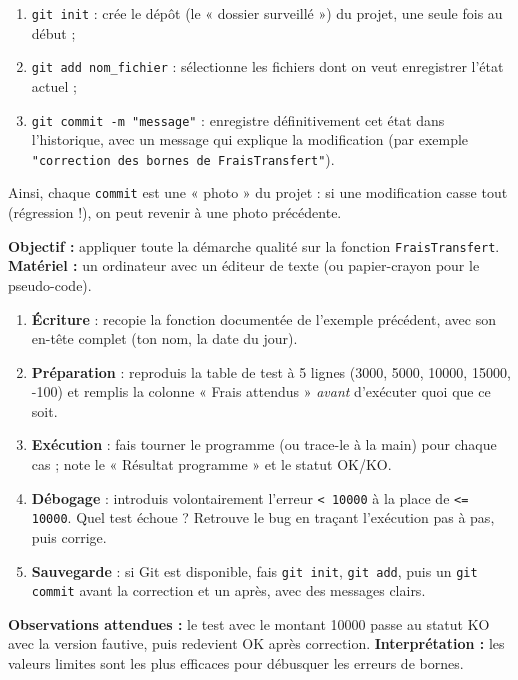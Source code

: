 \documentclass[11pt]{article}
\begin{document}
\begin{methode}
\begin{enumerate}
\item \texttt{git init} : crée le dépôt (le « dossier surveillé ») du projet, une seule fois au début ;
\item \texttt{git add nom\_fichier} : sélectionne les fichiers dont on veut enregistrer l'état actuel ;
\item \texttt{git commit -m "message"} : enregistre définitivement cet état dans l'historique, avec un message qui explique la modification (par exemple \texttt{"correction des bornes de FraisTransfert"}).
\end{enumerate}
Ainsi, chaque \texttt{commit} est une « photo » du projet : si une modification casse tout (régression !), on peut revenir à une photo précédente.
\end{methode}

\begin{experience}
\textbf{Objectif :} appliquer toute la démarche qualité sur la fonction \texttt{FraisTransfert}. \textbf{Matériel :} un ordinateur avec un éditeur de texte (ou papier-crayon pour le pseudo-code).
\begin{enumerate}
\item \textbf{Écriture} : recopie la fonction documentée de l'exemple précédent, avec son en-tête complet (ton nom, la date du jour).
\item \textbf{Préparation} : reproduis la table de test à 5 lignes (3000, 5000, 10000, 15000, -100) et remplis la colonne « Frais attendus » \emph{avant} d'exécuter quoi que ce soit.
\item \textbf{Exécution} : fais tourner le programme (ou trace-le à la main) pour chaque cas ; note le « Résultat programme » et le statut OK/KO.
\item \textbf{Débogage} : introduis volontairement l'erreur \texttt{< 10000} à la place de \texttt{<= 10000}. Quel test échoue ? Retrouve le bug en traçant l'exécution pas à pas, puis corrige.
\item \textbf{Sauvegarde} : si Git est disponible, fais \texttt{git init}, \texttt{git add}, puis un \texttt{git commit} avant la correction et un après, avec des messages clairs.
\end{enumerate}
\textbf{Observations attendues :} le test avec le montant 10000 passe au statut KO avec la version fautive, puis redevient OK après correction. \textbf{Interprétation :} les valeurs limites sont les plus efficaces pour débusquer les erreurs de bornes.
\end{experience}
\end{document}
